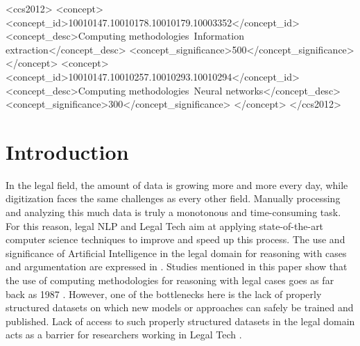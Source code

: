 \documentclass[sigconf]{acmart}
\begin{document}
\begin{CCSXML}
<ccs2012>
   <concept>
       <concept_id>10010147.10010178.10010179.10003352</concept_id>
       <concept_desc>Computing methodologies~Information extraction</concept_desc>
       <concept_significance>500</concept_significance>
       </concept>
   <concept>
       <concept_id>10010147.10010257.10010293.10010294</concept_id>
       <concept_desc>Computing methodologies~Neural networks</concept_desc>
       <concept_significance>300</concept_significance>
       </concept>
 </ccs2012>
\end{CCSXML}




\maketitle

\section{Introduction}
\label{sec:introduction}

In the legal field, the amount of data is growing more and more every day, while digitization faces the same challenges as every other field. Manually processing and analyzing this much data is truly a monotonous and time-consuming task. For this reason, legal NLP and Legal Tech aim at applying state-of-the-art computer science techniques to improve and speed up this process. The use and significance of Artificial Intelligence in the legal domain for reasoning with cases and argumentation are expressed in \cite{governatori2022thirty}. Studies mentioned in this paper show that the use of computing methodologies for reasoning with legal cases goes as far back as 1987 \cite{10.1145/41735.41743}. However, one of the bottlenecks here is the lack of properly structured datasets on which new models or approaches can safely be trained and published. Lack of access to such properly structured datasets in the legal domain acts as a barrier for researchers working in Legal Tech \cite{bradford2019competition,xiao2018cail2018}.
\end{document}

